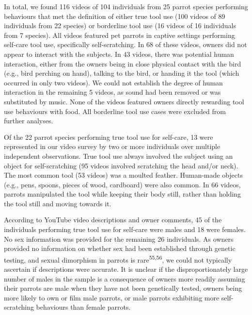 \documentclass[
  man, donotrepeattitle,floatsintext]{apa6}
\begin{document}
In total, we found 116 videos of
104 individuals from
25
parrot species performing behaviours that met the definition of either true tool
use (100 videos of
89
individuals from
22
species) or borderline tool use (16 videos of
16
individuals from
7
species). All videos featured pet parrots in captive settings performing
self-care tool use, specifically self-scratching. In
68 of these
videos, owners did not appear to interact with the subjects. In
43 videos,
there was potential human interaction, either from the owners being in close physical
contact with the bird (e.g., bird perching on hand), talking to the bird, or
handing it the tool (which occurred in only two videos). We could not establish
the degree of human interaction in the remaining
5
videos, as sound had been removed or was substituted by music. None of the
videos featured owners directly rewarding tool use behaviours with food. All
borderline tool use cases were excluded from further analyses.

Of the 22
parrot species performing true tool use for self-care,
13
were represented in our video survey by two or more individuals over multiple
independent observations. True tool use always involved the subject using an
object for self-scratching (95
videos involved scratching the head and/or neck). The most common tool (53
videos) was a moulted feather. Human-made objects (e.g., pens, spoons, pieces of
wood, cardboard) were also common. In 66
videos, parrots manipulated the tool while keeping their body still, rather than
holding the tool still and moving towards it.

According to YouTube video descriptions and owner comments,
45
of the individuals performing true tool use for self-care were males and
18
were females. No sex information was provided for the remaining
26
individuals. As owners provided no information on whether sex had been
established through genetic testing, and sexual dimorphism in parrots is
rare\textsuperscript{55,56}, we could not typically ascertain if descriptions
were accurate. It is unclear if the disproportionately large number of males in
the sample is a consequence of owners more readily assuming their parrots are
male when they have not been genetically tested, owners being more likely to own
or film male parrots, or male parrots exhibiting more self-scratching behaviours
than female parrots.
\end{document}
